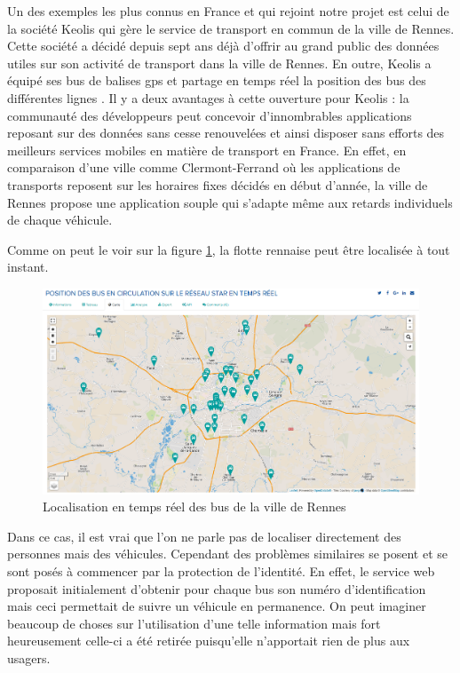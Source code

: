 Un des exemples les plus connus en France et qui rejoint notre projet est celui de la société Keolis qui gère le service de transport en commun de la ville de Rennes. Cette société a décidé depuis sept ans déjà d’offrir au grand public des données utiles sur son activité de transport dans la ville de Rennes. En outre, Keolis a équipé ses bus de balises gps et partage en temps réel la position des bus des différentes lignes \cite{stardataexplore}. Il y a deux avantages à cette ouverture pour Keolis : la communauté des développeurs peut concevoir d’innombrables applications reposant sur des données sans cesse renouvelées et ainsi disposer sans efforts des meilleurs services mobiles en matière de transport en France. En effet, en comparaison d’une ville comme Clermont-Ferrand où les applications de transports reposent sur les horaires fixes décidés en début d’année, la ville de Rennes propose une application souple qui s’adapte même aux retards individuels de chaque véhicule.

Comme on peut le voir sur la figure \ref{rennes}, la flotte rennaise peut être localisée à tout instant.

\begin{figure}[H]
    \centering
    \includegraphics[width=\textwidth]{./img/rennes.png}
    \caption{Localisation en temps réel des bus de la ville de Rennes}
    \label{rennes}
\end{figure}

Dans ce cas, il est vrai que l’on ne parle pas de localiser directement des personnes mais des véhicules. Cependant des problèmes similaires se posent et se sont posés à commencer par la protection de l’identité. En effet, le service web proposait initialement d’obtenir pour chaque bus son numéro d’identification mais ceci permettait de suivre un véhicule en permanence. On peut imaginer beaucoup de choses sur l’utilisation d’une telle information mais fort heureusement celle-ci a été retirée puisqu’elle n’apportait rien de plus aux usagers.

